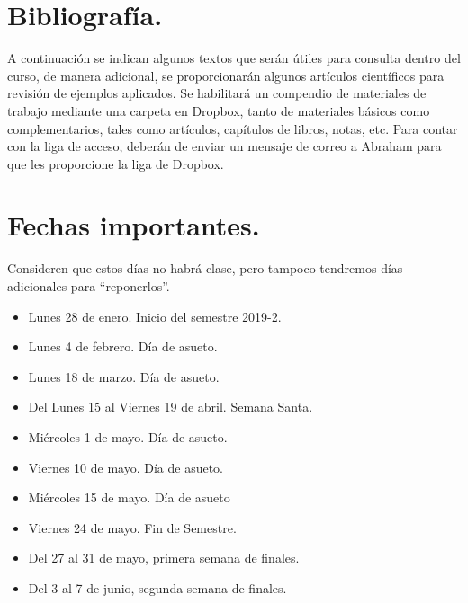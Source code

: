\documentclass[12pt]{article}
\begin{document}
\section{Bibliografía.}
A continuación se indican algunos textos que serán útiles para consulta dentro del curso, de manera adicional, se proporcionarán algunos artículos científicos para revisión de ejemplos aplicados. Se habilitará un compendio de materiales de trabajo mediante una carpeta en Dropbox, tanto de materiales básicos como complementarios, tales como artículos, capítulos de libros, notas, etc. Para contar con la liga de acceso, deberán de enviar un mensaje de correo a Abraham para que les proporcione la liga de Dropbox.

\renewcommand{\refname}{Bibliografía básica.}
\nocite{*}



\section{Fechas importantes.}
Consideren que estos días no habrá clase, pero tampoco tendremos días adicionales para \enquote{reponerlos}.
\begin{itemize}
\item Lunes 28 de enero. Inicio del semestre 2019-2.
\item Lunes 4 de febrero. Día de asueto.
\item Lunes 18 de marzo. Día de asueto.
\item Del Lunes 15 al Viernes 19 de abril. Semana Santa.
\item Miércoles 1 de mayo. Día de asueto.
\item Viernes 10 de mayo. Día de asueto.
\item Miércoles 15 de mayo. Día de asueto
\item Viernes 24 de mayo. Fin de Semestre.
\item Del 27 al 31 de mayo, primera semana de finales.
\item Del 3 al 7 de junio, segunda semana de finales.
\end{itemize}
\end{document}
